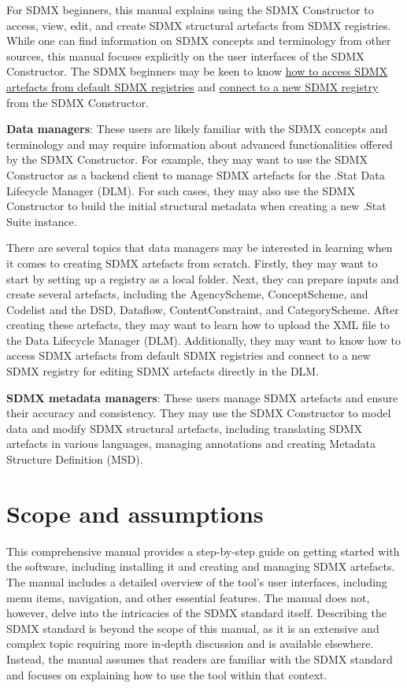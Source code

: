 \documentclass[
]{book}
\theoremstyle{definition}
\theoremstyle{definition}
\theoremstyle{definition}
\theoremstyle{definition}
\theoremstyle{remark}
\begin{document}
For SDMX beginners, this manual explains using the SDMX Constructor to access, view, edit, and create SDMX structural artefacts from SDMX registries. While one can find information on SDMX concepts and terminology from other sources, this manual focuses explicitly on the user interfaces of the SDMX Constructor. The SDMX beginners may be keen to know \protect\hyperlink{accessing}{how to access SDMX artefacts from default SDMX registries} and \protect\hyperlink{connect}{connect to a new SDMX registry} from the SDMX Constructor.

\textbf{Data managers}: These users are likely familiar with the SDMX concepts and terminology and may require information about advanced functionalities offered by the SDMX Constructor. For example, they may want to use the SDMX Constructor as a backend client to manage SDMX artefacts for the .Stat Data Lifecycle Manager (DLM). For such cases, they may also use the SDMX Constructor to build the initial structural metadata when creating a new .Stat Suite instance.

There are several topics that data managers may be interested in learning when it comes to creating SDMX artefacts from scratch. Firstly, they may want to start by setting up a registry as a local folder. Next, they can prepare inputs and create several artefacts, including the AgencyScheme, ConceptScheme, and Codelist and the DSD, Dataflow, ContentConstraint, and CategoryScheme. After creating these artefacts, they may want to learn how to upload the XML file to the Data Lifecycle Manager (DLM). Additionally, they may want to know how to access SDMX artefacts from default SDMX registries and connect to a new SDMX registry for editing SDMX artefacts directly in the DLM.

\textbf{SDMX metadata managers}: These users manage SDMX artefacts and ensure their accuracy and consistency. They may use the SDMX Constructor to model data and modify SDMX structural artefacts, including translating SDMX artefacts in various languages, managing annotations and creating Metadata Structure Definition (MSD).

\hypertarget{scope-and-assumptions}{%
\section*{Scope and assumptions}\label{scope-and-assumptions}}

This comprehensive manual provides a step-by-step guide on getting started with the software, including installing it and creating and managing SDMX artefacts. The manual includes a detailed overview of the tool's user interfaces, including menu items, navigation, and other essential features. The manual does not, however, delve into the intricacies of the SDMX standard itself. Describing the SDMX standard is beyond the scope of this manual, as it is an extensive and complex topic requiring more in-depth discussion and is available elsewhere. Instead, the manual assumes that readers are familiar with the SDMX standard and focuses on explaining how to use the tool within that context.
\end{document}
